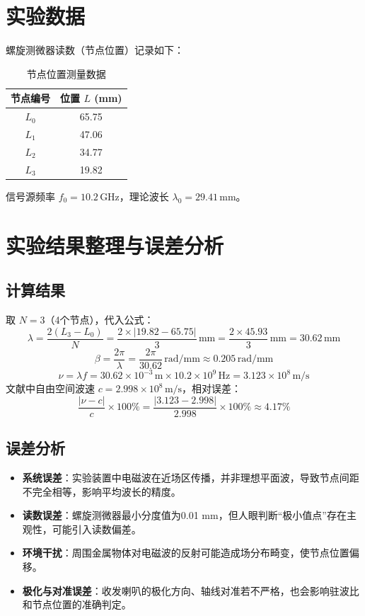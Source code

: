 \documentclass{../ElectromagneticFieldTemplate}
\begin{document}
\section{实验数据}
螺旋测微器读数（节点位置）记录如下：
\begin{table}[H]
    \centering
    \caption{节点位置测量数据}
    \begin{tabular}{c|c}
        \hline
        节点编号 & 位置 \(L\) (mm) \\
        \hline
        \(L_0\) & 65.75 \\
        \(L_1\) & 47.06 \\
        \(L_2\) & 34.77 \\
        \(L_3\) & 19.82 \\
        \hline
    \end{tabular}
\end{table}
信号源频率 \(f_0 = 10.2\,\text{GHz}\)，理论波长 \(\lambda_0 = 29.41\,\text{mm}\)。

\section{实验结果整理与误差分析}
\subsection{计算结果}
取 \(N=3\)（4个节点），代入公式：
\[
\lambda = \frac{2(L_3 - L_0)}{N} = \frac{2 \times |19.82 - 65.75|}{3}\,\text{mm} = \frac{2 \times 45.93}{3}\,\text{mm} = 30.62\,\text{mm}
\]
\[
\beta = \frac{2\pi}{\lambda} = \frac{2\pi}{30.62}\,\text{rad/mm} \approx 0.205\,\text{rad/mm}
\]
\[
\nu = \lambda f = 30.62\times10^{-3}\,\text{m} \times 10.2\times10^9\,\text{Hz} = 3.123\times10^8\,\text{m/s}
\]
文献中自由空间波速 \(c = 2.998\times10^8\,\text{m/s}\)，相对误差：
\[
\frac{|\nu - c|}{c} \times 100\% = \frac{|3.123-2.998|}{2.998}\times100\% \approx 4.17\%
\]

\subsection{误差分析}
\begin{itemize}
    \item \textbf{系统误差}：实验装置中电磁波在近场区传播，并非理想平面波，导致节点间距不完全相等，影响平均波长的精度。
    \item \textbf{读数误差}：螺旋测微器最小分度值为0.01 mm，但人眼判断“极小值点”存在主观性，可能引入读数偏差。
    \item \textbf{环境干扰}：周围金属物体对电磁波的反射可能造成场分布畸变，使节点位置偏移。
    \item \textbf{极化与对准误差}：收发喇叭的极化方向、轴线对准若不严格，也会影响驻波比和节点位置的准确判定。
\end{itemize}
\end{document}
